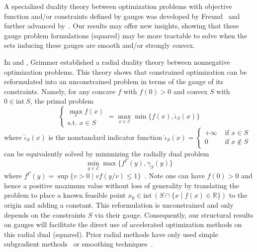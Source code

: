\documentclass[sn-mathphys,Numbered]{sn-jnl}%
\begin{document}
A specialized duality theory between optimization problems with objective function and/or constraints defined by gauges was developed by Freund~\cite{Freund1987} and further advanced by~\cite{Friedlander2014,Aravkin2018}. Our results may offer new insights, showing that these gauge problem formulations (squared) may be more tractable to solve when the sets inducing these gauges are smooth and/or strongly convex.

In \cite{grimmer2023radial1} and \cite{grimmer2023radial2}, Grimmer established a radial duality theory between nonnegative optimization problems. This theory shows that constrained optimization can be reformulated into an unconstrained problem in terms of the gauge of its constraints. Namely, for any concave $f$ with $f(0)>0$ and convex $S$ with $0\in \mathrm{int\ }S$, the primal problem
\begin{equation}
    \begin{cases} \max_x f(x)\\ \text{s.t. } x\in S \end{cases} = \max_{x\in\mathcal{E}} \min\{f(x), \hat \iota_S(x)\}
\end{equation}
where $\hat \iota_S(x)$ is the nonstandard indicator function $\hat \iota_S(x)=\begin{cases}+\infty & \text{ if } x\in S\\ 0 & \text{ if } x \notin S \end{cases}$ can be equivalently solved by minimizing the radially dual problem
\begin{equation}
    \min_{y\in\mathcal{E}} \max\{f^\Gamma(y),\gamma_S(y)\}
\end{equation}
where $f^\Gamma(y)=\sup\{ v>0 \mid v f(y/v) \leq 1\}$~\cite[Proposition 24]{grimmer2023radial1}. Note one can have $f(0)>0$ and hence a positive maximum value without loss of generality by translating the problem to place a known feasible point $x_0\in \mathrm{int \ } \left(S \cap \{x \mid f(x) \in \mathbb{R}\}\right)$ to the origin and adding a constant. This reformulation is unconstrained and only depends on the constraints $S$ via their gauge. Consequently, our structural results on gauges will facilitate the direct use of accelerated optimization methods on this radial dual (squared). Prior radial methods have only used simple subgradient methods~\cite{Renegar2016,Grimmer2017} or smoothing techniques~\cite{Renegar2019,grimmer2023radial2}.
\end{document}
